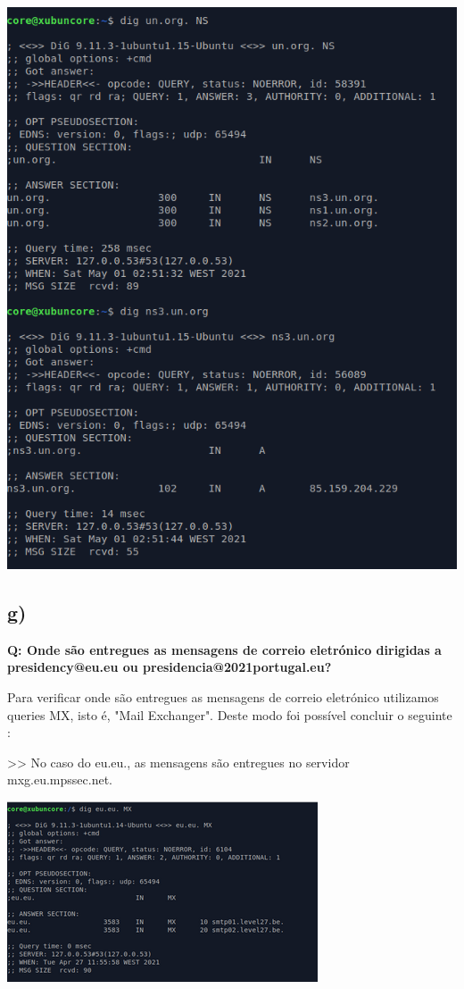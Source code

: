 \documentclass[a4paper]{article}
\begin{document}
\begin{center}
\includegraphics[scale=0.5]{images/authority}
\end{center}

\newpage

\subsection{ g)} \textbf{ Q: Onde são entregues as  mensagens de correio eletrónico dirigidas a presidency@eu.eu ou presidencia@2021portugal.eu?}\par
\qquad Para verificar onde são entregues as mensagens de correio eletrónico utilizamos queries MX, isto é, "Mail Exchanger". Deste modo foi possível concluir o seguinte :\par
\qquad >> No caso do eu.eu., as mensagens são entregues no servidor mxg.eu.mpssec.net.

\begin{center}
\includegraphics[scale=0.75]{images/eu.eu}
\end{center}
\end{document}

